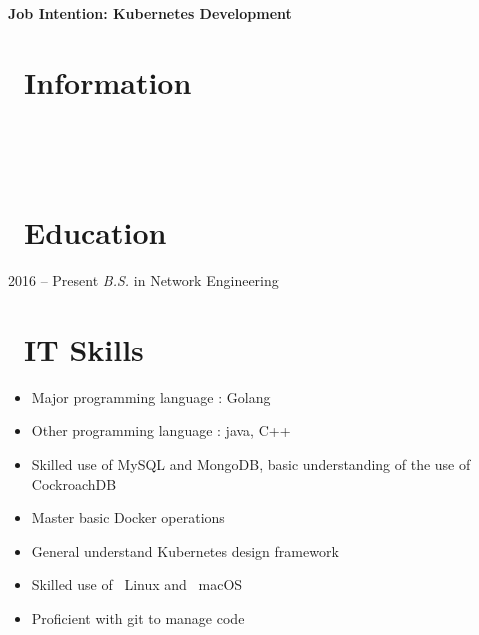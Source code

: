 \documentclass{resume}
\begin{document}

  \hfill \vspace{2mm} \par
\textbf{Job Intention: Kubernetes Development}

\section{\faUserSecret\ Information} \vspace{1mm}

{\phone\  \qquad\qquad\quad
	\email\ 
	\vspace{2mm} \par
	\github\  \qquad
	\faLink\ }

\section{\faGraduationCap\ Education} \vspace{1mm}

{2016 -- Present}
\vspace{1mm}
\textit{B.S.} in Network Engineering

\section{\faCogs\ IT Skills} \vspace{1mm}

\begin{itemize}[parsep=1ex]
	\item Major programming language : Golang
	\item Other programming language : java, C++
	\item Skilled use of MySQL and MongoDB, basic understanding of the use of CockroachDB
	\item Master basic Docker operations
	\item General understand Kubernetes design framework
	\item Skilled use of \faLinux\ {Linux} and \faApple\ {macOS}
	\item Proficient with git to manage code
\end{itemize}
\end{document}
